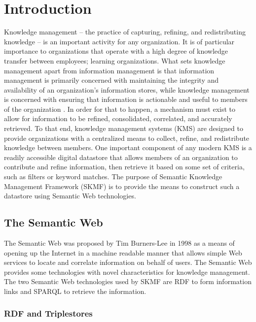 \chapter{Introduction}
\label{intro}

Knowledge management -- the practice of capturing, refining, and redistributing knowledge -- is an important activity for any organization. It is of particular importance to organizations that operate with a high degree of knowledge transfer between employees; learning organizations. What sets knowledge management apart from information management is that information management is primarily concerned with maintaining the integrity and availability of an organization's information stores, while knowledge management is concerned with ensuring that information is actionable and useful to members of the organization
\cite{kmtoolkit}.
In order for that to happen, a mechanism must exist to allow for information to be refined, consolidated, correlated, and accurately retrieved. To that end, knowledge management systems (KMS) are designed to provide organizations with a centralized means to collect, refine, and redistribute knowledge between members. One important component of any modern KMS is a readily accessible digital datastore that allows members of an organization to contribute and refine information, then retrieve it based on some set of criteria, such as filters or keyword matches. The purpose of Semantic Knowledge Management Framework (SKMF) is to provide the means to construct such a datastore using Semantic Web technologies.


\section{The Semantic Web}
\label{intro:semantic}

The Semantic Web was proposed by Tim Burners-Lee in 1998
\cite{bernerslee}
as a means of opening up the Internet in a machine readable manner that allows simple Web services to locate and correlate information on behalf of users. The Semantic Web provides some technologies with novel characteristics for knowledge management. The two Semantic Web technologies used by SKMF are RDF to form information links and SPARQL
\cite{sparql}
to retrieve the information.


\subsection{RDF and Triplestores}
\label{intro:rdf}

